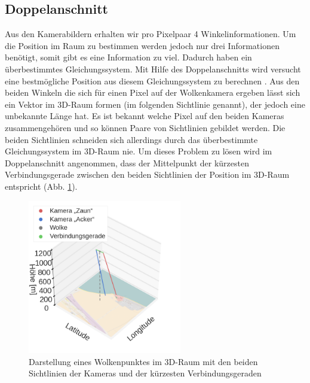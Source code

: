 \documentclass[a4paper,11pt,twoside,german]{article}
\newcommand{\absatz}{\smallbreak}
\begin{document}
\subsection{Doppelanschnitt}
\label{SECDoppel}
Aus den Kamerabildern erhalten wir pro Pixelpaar 4 Winkelinformationen. Um die Position im Raum zu bestimmen werden jedoch nur drei Informationen benötigt, somit gibt es eine Information zu viel. Dadurch haben ein überbestimmtes Gleichungssystem. Mit Hilfe des Doppelanschnitts wird versucht eine bestmögliche Position aus diesem Gleichungssystem zu berechnen \citep{lange_16_praktikum}.
\clearpage
Aus den beiden Winkeln die sich für einen Pixel auf der Wolkenkamera ergeben lässt sich ein Vektor im 3D-Raum formen (im folgenden Sichtlinie genannt), der jedoch eine unbekannte Länge hat. Es ist bekannt welche Pixel auf den beiden Kameras zusammengehören und so können Paare von Sichtlinien gebildet werden. Die beiden Sichtlinien schneiden sich allerdings durch das überbestimmte Gleichungssystem im 3D-Raum nie. Um dieses Problem zu lösen wird im Doppelanschnitt angenommen, dass der Mittelpunkt der kürzesten Verbindungsgerade zwischen den beiden Sichtlinien der Position im 3D-Raum entspricht (Abb. \ref{FIGDoppel3d}).\absatz
\begin{figure}[h]
	\begin{center}
		\includegraphics[width=0.6\textwidth]{media/3d.png}
		\caption[Darstellung des Doppelanschnitts]{Darstellung eines Wolkenpunktes im 3D-Raum mit den beiden Sichtlinien der Kameras und der kürzesten Verbindungsgeraden}
		\label{FIGDoppel3d}
	\end{center}
\end{figure}
\end{document}
